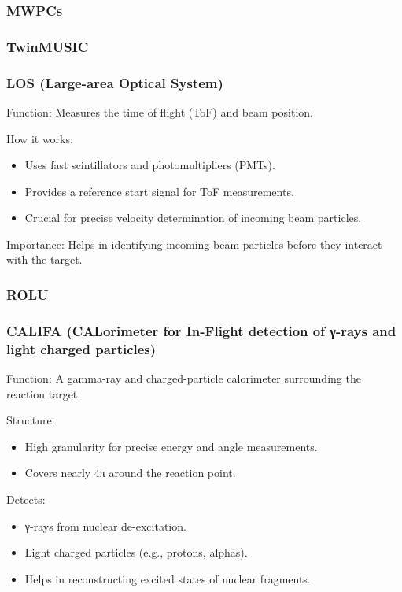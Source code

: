 \subsubsection{MWPCs}

\subsubsection{TwinMUSIC}

\subsubsection{LOS (Large-area Optical System)}

Function: Measures the time of flight (ToF) and beam position.

How it works:

\begin{itemize}
	\item Uses fast scintillators and photomultipliers (PMTs).
	\item Provides a reference start signal for ToF measurements.
	\item Crucial for precise velocity determination of incoming beam particles.
\end{itemize}

Importance: Helps in identifying incoming beam particles before they interact with the target.


\subsubsection{ROLU}

\subsubsection{CALIFA (CALorimeter for In-Flight detection of γ-rays and light charged particles)}

Function: A gamma-ray and charged-particle calorimeter surrounding the reaction target.

Structure:

\begin{itemize}
	\item High granularity for precise energy and angle measurements.
	\item Covers nearly 4π around the reaction point.
\end{itemize}


Detects:

\begin{itemize}
	\item γ-rays from nuclear de-excitation.
	\item Light charged particles (e.g., protons, alphas).
	\item Helps in reconstructing excited states of nuclear fragments.
\end{itemize}

